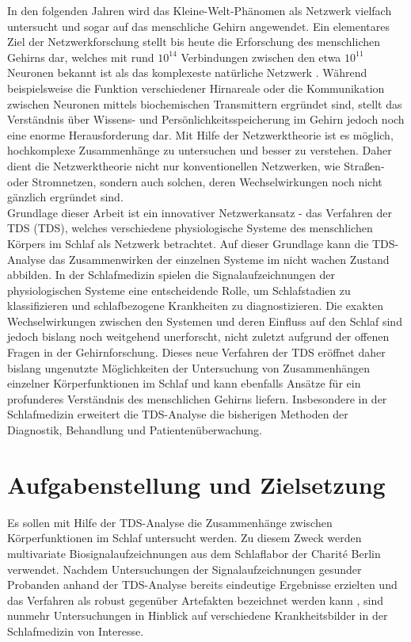 In den folgenden Jahren wird das Kleine-Welt-Phänomen als Netzwerk vielfach untersucht und sogar auf das menschliche Gehirn angewendet. Ein elementares Ziel der Netzwerkforschung stellt bis heute die Erforschung des menschlichen Gehirns dar, welches mit rund $10^{14}$ Verbindungen zwischen den etwa $10^{11}$ Neuronen bekannt ist als das komplexeste natürliche Netzwerk \parencite{ertel_grundkurs_2013}. Während beispielsweise die Funktion verschiedener Hirnareale oder die Kommunikation zwischen Neuronen mittels biochemischen Transmittern ergründet sind, stellt das Verständnis über Wissens- und Persönlichkeitsspeicherung im Gehirn jedoch noch eine enorme Herausforderung dar. Mit Hilfe der Netzwerktheorie ist es möglich, hochkomplexe Zusammenhänge zu untersuchen und besser zu verstehen. Daher dient die Netzwerktheorie nicht nur konventionellen Netzwerken, wie Straßen- oder Stromnetzen, sondern auch solchen, deren Wechselwirkungen noch nicht gänzlich ergründet sind. \parencite{lenzen_alles_2016}\\

Grundlage dieser Arbeit ist ein innovativer Netzwerkansatz - das Verfahren der \acl{TDS} (\acs{TDS}), welches verschiedene physiologische Systeme des menschlichen Körpers im Schlaf als Netzwerk betrachtet. Auf dieser Grundlage kann die \acs{TDS}-Analyse das Zusammenwirken der einzelnen Systeme im nicht wachen Zustand abbilden. In der Schlafmedizin spielen die Signalaufzeichnungen der physiologischen Systeme eine entscheidende Rolle, um Schlafstadien zu klassifizieren und schlafbezogene Krankheiten zu diagnostizieren. Die exakten Wechselwirkungen zwischen den Systemen und deren Einfluss auf den Schlaf sind jedoch bislang noch weitgehend unerforscht, nicht zuletzt aufgrund der offenen Fragen in der Gehirnforschung. Dieses neue Verfahren der \acs{TDS} eröffnet daher bislang ungenutzte Möglichkeiten der Untersuchung von Zusammenhängen einzelner Körperfunktionen im Schlaf und kann ebenfalls Ansätze für ein profunderes Verständnis des menschlichen Gehirns liefern. Insbesondere in der Schlafmedizin erweitert die \acs{TDS}-Analyse die bisherigen Methoden der Diagnostik, Behandlung und Patientenüberwachung. \parencite{bashan_network_2012, penzel_schlafstorungen_2005}

\section{Aufgabenstellung und Zielsetzung}

Es sollen mit Hilfe der \acs{TDS}-Analyse die Zusammenhänge zwischen Körperfunktionen im Schlaf untersucht werden. Zu diesem Zweck werden multivariate Biosignalaufzeichnungen aus dem Schlaflabor der Charité Berlin verwendet. Nachdem Untersuchungen der Signalaufzeichnungen gesunder Probanden anhand der \acs{TDS}-Analyse bereits eindeutige Ergebnisse erzielten \parencite{bashan_network_2012} und das Verfahren als robust gegenüber Artefakten bezeichnet werden kann \parencite{breuer_netzwerktopologie_2016}, sind nunmehr Untersuchungen in Hinblick auf verschiedene Krankheitsbilder in der Schlafmedizin von Interesse. 

